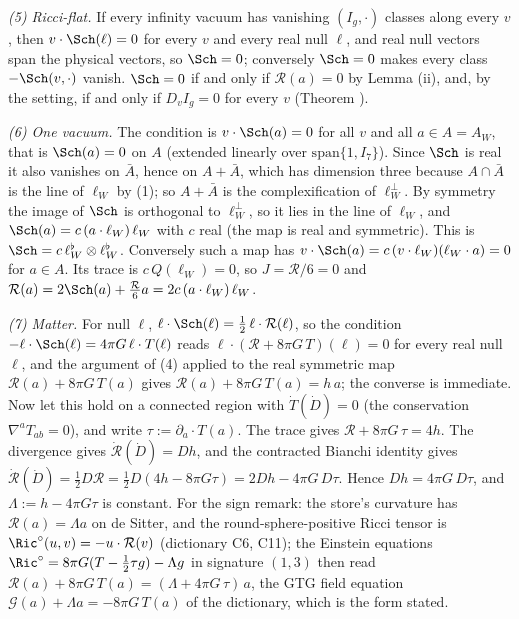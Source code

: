 \emph{(5) Ricci-flat.} If every infinity vacuum has vanishing $(I_g, \cdot)$ classes along every $v$, then $v\cdot\Sch(\ell) = 0$ for every $v$ and every real null $\ell$, and real null vectors span the physical vectors, so $\Sch = 0$; conversely $\Sch = 0$ makes every class $-\Sch(v, \cdot)$ vanish. $\Sch = 0$ if and only if $\mathcal{R}(a) = 0$ by Lemma (ii), and, by the setting, if and only if $D_{v}I_g = 0$ for every $v$ (Theorem ).

\emph{(6) One vacuum.} The condition is $v\cdot\Sch(a) = 0$ for all $v$ and all $a \in A = A_W$, that is $\Sch(a) = 0$ on $A$ (extended linearly over $\mathrm{span}\{1, I_{7}\}$). Since $\Sch$ is real it also vanishes on $\bar A$, hence on $A + \bar A$, which has dimension three because $A \cap \bar A$ is the line of $\ell_W$ by (1); so $A + \bar A$ is the complexification of $\ell_W^{\perp}$. By symmetry the image of $\Sch$ is orthogonal to $\ell_W^{\perp}$, so it lies in the line of $\ell_W$, and $\Sch(a) = c\,(a\cdot\ell_W)\,\ell_W$ with $c$ real (the map is real and symmetric). This is $\Sch = c\,\ell_W^{\flat}\otimes\ell_W^{\flat}$. Conversely such a map has $v\cdot\Sch(a) = c\,(v\cdot\ell_W)(\ell_W\cdot a) = 0$ for $a \in A$. Its trace is $c\,Q(\ell_W) = 0$, so $J = \mathcal{R}/6 = 0$ and $\mathcal{R}(a) = 2\Sch(a) + \tfrac{\mathcal{R}}{6}a = 2c\,(a\cdot\ell_W)\,\ell_W$.

\emph{(7) Matter.} For null $\ell$, $\ell\cdot\Sch(\ell) = \tfrac12\,\ell\cdot\mathcal{R}(\ell)$, so the condition $-\ell\cdot\Sch(\ell) = 4\pi G\,\ell\cdot T(\ell)$ reads $\ell\cdot(\mathcal{R} + 8\pi G\,T)(\ell) = 0$ for every real null $\ell$, and the argument of (4) applied to the real symmetric map $\mathcal{R}(a) + 8\pi G\,T(a)$ gives $\mathcal{R}(a) + 8\pi G\,T(a) = h\,a$; the converse is immediate. Now let this hold on a connected region with $\dot T(\dot D) = 0$ (the conservation $\nabla^{a}T_{ab} = 0$), and write $\tau := \partial_{a}\cdot T(a)$. The trace gives $\mathcal{R} + 8\pi G\,\tau = 4h$. The divergence gives $\dot{\mathcal{R}}(\dot D) = Dh$, and the contracted Bianchi identity gives $\dot{\mathcal{R}}(\dot D) = \tfrac12 D\mathcal{R} = \tfrac12 D(4h - 8\pi G\tau) = 2Dh - 4\pi G\,D\tau$. Hence $Dh = 4\pi G\,D\tau$, and $\Lambda := h - 4\pi G\tau$ is constant. For the sign remark: the store's curvature has $\mathcal{R}(a) = \Lambda a$ on de Sitter, and the round-sphere-positive Ricci tensor is $\Ric^{\circ}(u, v) = -u\cdot\mathcal{R}(v)$ (dictionary C6, C11); the Einstein equations $\Ric^{\circ} = 8\pi G(T - \tfrac12\tau g) - \Lambda g$ in signature $(1,3)$ then read $\mathcal{R}(a) + 8\pi G\,T(a) = (\Lambda + 4\pi G\,\tau)\,a$, the GTG field equation $\mathcal{G}(a) + \Lambda a = -8\pi G\,T(a)$ of the dictionary, which is the form stated.

